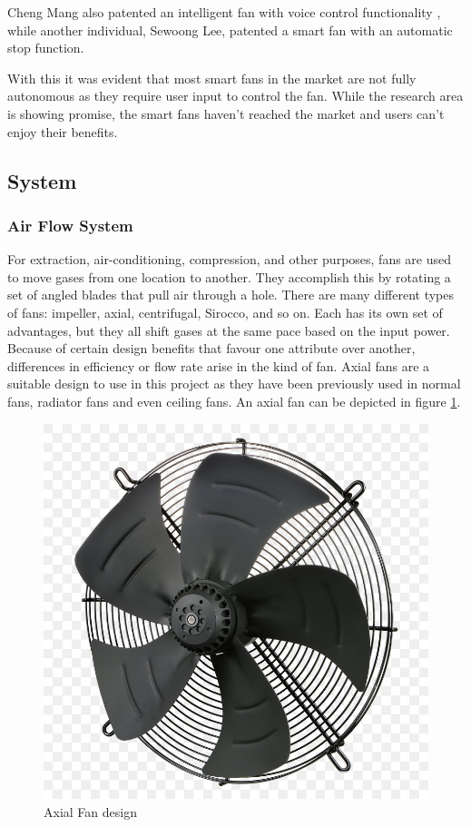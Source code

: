 \par
Cheng Mang also patented an intelligent fan with voice control functionality \cite{_smart_2021}, while another individual, Sewoong Lee, patented a smart fan with an automatic stop function.
\par
With this it was evident that most smart fans in the market are not fully autonomous as they require user input to control the fan. While the research area is showing promise, the smart fans haven’t reached the market and users can’t enjoy their benefits.


\subsection{System}


\subsubsection{Air Flow System}

For extraction, air-conditioning, compression, and other purposes, fans are used to move gases from one location to another. They accomplish this by rotating a set of angled blades that pull air through a hole.
There are many different types of fans: impeller, axial, centrifugal, Sirocco, and so on. Each has its own set of advantages, but they all shift gases at the same pace based on the input power. Because of certain design benefits that favour one attribute over another, differences in efficiency or flow rate arise in the kind of fan.
Axial fans are a suitable design to use in this project as they have been previously used in normal fans, radiator fans and even ceiling fans. An axial fan can be depicted in figure \ref{fig:axialfandesign}.

\begin{figure}[htbp]
\includegraphics[scale=0.3]{Figures/Figure-02-axial-fan-design.jpg}
\centering
\caption{Axial Fan design \cite{noauthor_axial_nodate}}
\label{fig:axialfandesign}
\end{figure}


